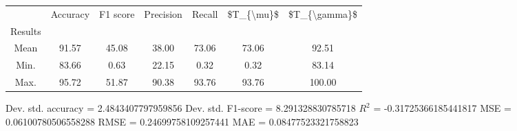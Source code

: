 \begin{tabular}{|c|c|c|c|c|c|c|}
\toprule
{} &  Accuracy &  F1 score &  Precision &  Recall &  \$T\_\{\textbackslash mu\}\$ &  \$T\_\{\textbackslash gamma\}\$ \\
Results &           &           &            &         &            &               \\
\hline
Mean    &     91.57 &     45.08 &      38.00 &   73.06 &      73.06 &         92.51 \\
Min.    &     83.66 &      0.63 &      22.15 &    0.32 &       0.32 &         83.14 \\
Max.    &     95.72 &     51.87 &      90.38 &   93.76 &      93.76 &        100.00 \\
\bottomrule
\end{tabular}

 Dev. std. accuracy = 2.4843407797959856
 Dev. std. F1-score = 8.291328830785718
 $R^2$ = -0.31725366185441817
 MSE = 0.06100780506558288
 RMSE = 0.24699758109257441
 MAE = 0.08477523321758823